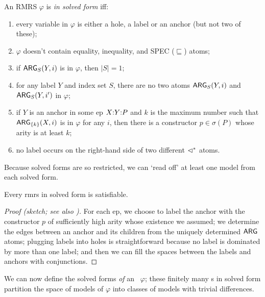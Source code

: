 \begin{definition}\label{defn:solved-forms}
  An RMRS $\varphi$ is \emph{in solved form} iff:
  \begin{enumerate}
  \item every variable in $\varphi$ is either a hole, a label or an
    anchor (but not two of these);
  \item $\varphi$ doesn't contain equality, inequality, and SPEC
    ($\sqsubseteq$) atoms;
  \item if $\mathsf{ARG}_S(Y,i)$ is in $\varphi$, then $|S| = 1$;
  \item for any label $Y$ and index set $S$, there
    are no two atoms $\mathsf{ARG}_S(Y,i)$ and $\mathsf{ARG}_S(Y,i')$ in $\varphi$;
  \item if $Y$ is an anchor in some {\sc ep} $X {:} Y {:} P$ and $k$ is the
    maximum number such that $\mathsf{ARG}_{\{k\}}(X,i)$ is in $\varphi$ for
    any $i$, then there is a constructor $p \in \sigma(P)$ whose arity
    is at least $k$;
  \item no label occurs on the right-hand side of two
    different $\lhd^*$ atoms.
  \end{enumerate}
\end{definition}

Because solved forms are so restricted, we can `read off' at least one
model from each solved form.

\begin{prop} \label{prop:solved-forms-are-satisfiable}
  Every {\sc rmrs} in solved form is satisfiable.
\end{prop}
\begin{proof}[Proof (sketch; see also
  \cite{Duchier00dominanceconstraints})] 
  For each {\sc ep}, we choose to label the anchor with the
  constructor $p$ of sufficiently high arity whose existence we
  assumed; we determine the edges between an anchor and its children
  from the uniquely determined $\mathsf{ARG}$ atoms; plugging labels into
  holes is straightforward because no label is dominated by more than
  one label; and then we can fill the spaces between the labels and
  anchors with conjunctions.
\end{proof}


We can now define the solved forms \emph{of} an \rmrs\ $\varphi$;
these finitely many \rmrs s in solved form partition the space of
models of $\varphi$ into classes of models with trivial differences.

